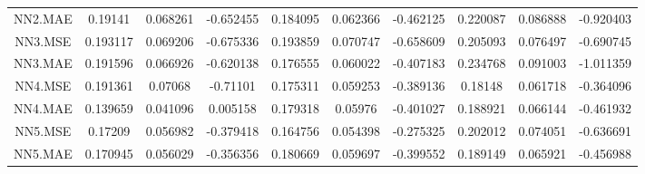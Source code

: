 \begin{longtable}[t]{cccccccccc}
NN2.MAE & 0.19141 & 0.068261 & -0.652455 & 0.184095 & 0.062366 & -0.462125 & 0.220087 & 0.086888 & -0.920403\\
NN3.MSE & 0.193117 & 0.069206 & -0.675336 & 0.193859 & 0.070747 & -0.658609 & 0.205093 & 0.076497 & -0.690745\\
NN3.MAE & 0.191596 & 0.066926 & -0.620138 & 0.176555 & 0.060022 & -0.407183 & 0.234768 & 0.091003 & -1.011359\\
NN4.MSE & 0.191361 & 0.07068 & -0.71101 & 0.175311 & 0.059253 & -0.389136 & 0.18148 & 0.061718 & -0.364096\\
NN4.MAE & 0.139659 & 0.041096 & 0.005158 & 0.179318 & 0.05976 & -0.401027 & 0.188921 & 0.066144 & -0.461932\\
NN5.MSE & 0.17209 & 0.056982 & -0.379418 & 0.164756 & 0.054398 & -0.275325 & 0.202012 & 0.074051 & -0.636691\\
NN5.MAE & 0.170945 & 0.056029 & -0.356356 & 0.180669 & 0.059697 & -0.399552 & 0.189149 & 0.065921 & -0.456988\\*
\end{longtable}
\endgroup{}